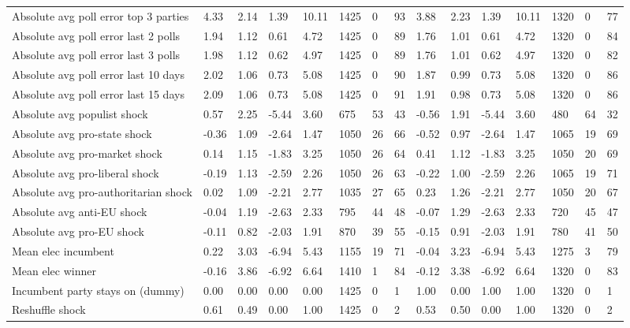 \begin{longtable}{lllllllllllllll}
Absolute avg poll error top 3 parties & 4.33 & 2.14 & 1.39 & 10.11 & 1425 & 0 & 93 & 3.88 & 2.23 & 1.39 & 10.11 & 1320 & 0 & 77\\
Absolute avg poll error last 2 polls & 1.94 & 1.12 & 0.61 & 4.72 & 1425 & 0 & 89 & 1.76 & 1.01 & 0.61 & 4.72 & 1320 & 0 & 84\\
\addlinespace
Absolute avg poll error last 3 polls & 1.98 & 1.12 & 0.62 & 4.97 & 1425 & 0 & 89 & 1.76 & 1.01 & 0.62 & 4.97 & 1320 & 0 & 82\\
Absolute avg poll error last 10 days & 2.02 & 1.06 & 0.73 & 5.08 & 1425 & 0 & 90 & 1.87 & 0.99 & 0.73 & 5.08 & 1320 & 0 & 86\\
Absolute avg poll error last 15 days & 2.09 & 1.06 & 0.73 & 5.08 & 1425 & 0 & 91 & 1.91 & 0.98 & 0.73 & 5.08 & 1320 & 0 & 86\\
Absolute avg populist shock & 0.57 & 2.25 & -5.44 & 3.60 & 675 & 53 & 43 & -0.56 & 1.91 & -5.44 & 3.60 & 480 & 64 & 32\\
Absolute avg pro-state shock & -0.36 & 1.09 & -2.64 & 1.47 & 1050 & 26 & 66 & -0.52 & 0.97 & -2.64 & 1.47 & 1065 & 19 & 69\\
\addlinespace
Absolute avg pro-market shock & 0.14 & 1.15 & -1.83 & 3.25 & 1050 & 26 & 64 & 0.41 & 1.12 & -1.83 & 3.25 & 1050 & 20 & 69\\
Absolute avg pro-liberal shock & -0.19 & 1.13 & -2.59 & 2.26 & 1050 & 26 & 63 & -0.22 & 1.00 & -2.59 & 2.26 & 1065 & 19 & 71\\
Absolute avg pro-authoritarian shock & 0.02 & 1.09 & -2.21 & 2.77 & 1035 & 27 & 65 & 0.23 & 1.26 & -2.21 & 2.77 & 1050 & 20 & 67\\
Absolute avg anti-EU shock & -0.04 & 1.19 & -2.63 & 2.33 & 795 & 44 & 48 & -0.07 & 1.29 & -2.63 & 2.33 & 720 & 45 & 47\\
Absolute avg pro-EU shock & -0.11 & 0.82 & -2.03 & 1.91 & 870 & 39 & 55 & -0.15 & 0.91 & -2.03 & 1.91 & 780 & 41 & 50\\
\addlinespace
Mean elec incumbent & 0.22 & 3.03 & -6.94 & 5.43 & 1155 & 19 & 71 & -0.04 & 3.23 & -6.94 & 5.43 & 1275 & 3 & 79\\
Mean elec winner & -0.16 & 3.86 & -6.92 & 6.64 & 1410 & 1 & 84 & -0.12 & 3.38 & -6.92 & 6.64 & 1320 & 0 & 83\\
Incumbent party stays on (dummy) & 0.00 & 0.00 & 0.00 & 0.00 & 1425 & 0 & 1 & 1.00 & 0.00 & 1.00 & 1.00 & 1320 & 0 & 1\\
Reshuffle shock & 0.61 & 0.49 & 0.00 & 1.00 & 1425 & 0 & 2 & 0.53 & 0.50 & 0.00 & 1.00 & 1320 & 0 & 2\\

\end{longtable}
